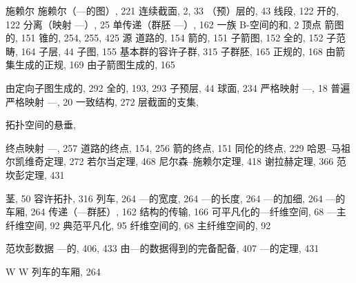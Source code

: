 
施赖尔 施赖尔（---的图）, 221 连续截面, 2, 33 （预）层的, 43 线段, 122 开的, 122 分离（映射 ---）, 25 单传递（群胚 ---）, 162 一族 B-空间的和, 2 顶点 箭图的, 151 锥的, 254, 255, 425 源 道路的, 154 箭的, 151 子箭图, 152 全的, 152 子范畴, 164 子层, 44 子图, 155 基本群的容许子群, 315 子群胚, 165 正规的, 168 由箭集生成的正规, 169 由子箭图生成的, 165

由定向子图生成的, 292 全的, 193, 293 子预层, 44 球面, 234 严格映射 ---, 18 普遍严格映射 ---, 20 一致结构, 272 层截面的支集,

拓扑空间的悬垂,


终点映射 ---, 257 道路的终点, 154, 256 箭的终点, 151 同伦的终点, 229 哈恩–马祖尔凯维奇定理, 272 若尔当定理, 468 尼尔森–施赖尔定理, 418 谢拉赫定理, 366 范坎彭定理, 431

茎, 50 容许拓扑, 316 列车, 264 ---的宽度, 264 ---的长度, 264 ---的加细, 264 ---的车厢, 264 传递（---群胚）, 162 结构的传输, 166 可平凡化的---纤维空间, 68 ---主纤维空间, 92 典范平凡化, 95 纤维空间的, 68 主纤维空间的, 92


范坎彭数据 ---的, 406, 433 由---的数据得到的完备配备, 407 ---的定理, 431

W W 列车的车厢, 264
\relax{}
